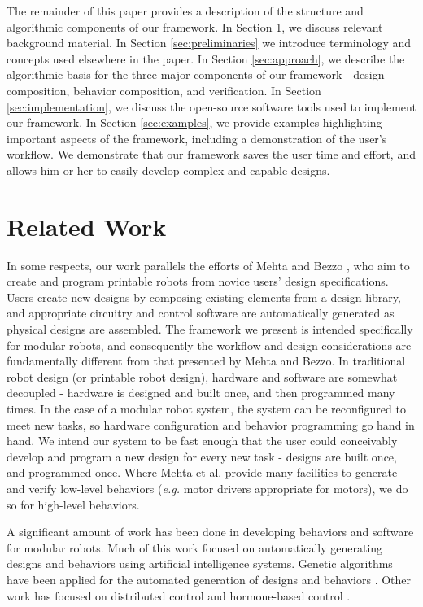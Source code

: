 \documentclass[conference]{IEEEtran}
\theoremstyle{definition}
\begin{document}
The remainder of this paper provides a  description of the
structure and algorithmic components of our framework.  In Section \ref{sec:related-work},
we discuss relevant background material.
In Section \ref{sec:preliminaries} we introduce terminology and  concepts used elsewhere in the
paper. 
In Section \ref{sec:approach}, we describe the algorithmic basis
for the three major components of our framework - design composition, behavior
composition, and verification.  In Section
\ref{sec:implementation}, we discuss the open-source software
tools used to implement our framework. In Section \ref{sec:examples}, we provide examples highlighting
important aspects of the framework, including a demonstration of the user's
workflow.  We demonstrate that our framework saves the
user time and effort, and allows him or her to easily develop complex and
capable designs.


\section{Related Work}
\label{sec:related-work}
In some respects, our work parallels the efforts of Mehta \cite{mehta2014design}
and Bezzo \cite{bezzo2014demo}, who aim to create and program printable robots from
novice users' design specifications.  Users create new designs by composing
existing elements from a design library, and appropriate circuitry and
control software are automatically generated as physical designs are assembled. The framework we present is
intended specifically for modular robots, and consequently the workflow and design considerations are fundamentally different
from that presented by Mehta and Bezzo.  In
traditional robot design (or printable robot design), hardware and software are somewhat
decoupled - hardware is
designed and built once, and then programmed many times.  In the case of a modular robot system, the system can be reconfigured to meet new tasks,
so hardware configuration and behavior programming go hand in hand.  We intend
our system to be fast enough that the user could conceivably develop and program
a new design for every new task - designs are built once, and programmed once.  Where Mehta et al. provide many facilities to generate and verify
low-level behaviors (\textit{e.g.} motor drivers appropriate for motors), we do so for
high-level behaviors.

A significant amount of work has been done in developing behaviors and software
for modular robots. Much of this work focused on automatically
generating designs and behaviors using artificial intelligence systems. Genetic
algorithms have been applied for the automated generation of designs
and behaviors \cite{hornby2003generative}. Other work has
focused on distributed control \cite{walter2002choosing} and hormone-based control
\cite{salemi2001hormone}.
\end{document}
